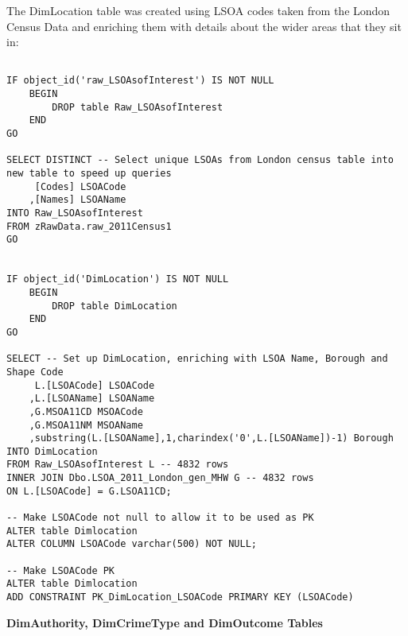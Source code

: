\documentclass{article}
\begin{document}
The DimLocation table was created using LSOA codes taken from the London Census Data and enriching them with details about the wider areas that they sit in:
\begin{lstlisting}

IF object_id('raw_LSOAsofInterest') IS NOT NULL 
	BEGIN 
		DROP table Raw_LSOAsofInterest
	END
GO

SELECT DISTINCT -- Select unique LSOAs from London census table into new table to speed up queries
	 [Codes] LSOACode
	,[Names] LSOAName
INTO Raw_LSOAsofInterest 
FROM zRawData.raw_2011Census1
GO


IF object_id('DimLocation') IS NOT NULL 
	BEGIN 
		DROP table DimLocation
	END
GO

SELECT -- Set up DimLocation, enriching with LSOA Name, Borough and Shape Code
	 L.[LSOACode] LSOACode
	,L.[LSOAName] LSOAName
	,G.MSOA11CD MSOACode
	,G.MSOA11NM MSOAName
	,substring(L.[LSOAName],1,charindex('0',L.[LSOAName])-1) Borough
INTO DimLocation 
FROM Raw_LSOAsofInterest L -- 4832 rows
INNER JOIN Dbo.LSOA_2011_London_gen_MHW G -- 4832 rows
ON L.[LSOACode] = G.LSOA11CD;

-- Make LSOACode not null to allow it to be used as PK
ALTER table Dimlocation
ALTER COLUMN LSOACode varchar(500) NOT NULL;

-- Make LSOACode PK
ALTER table Dimlocation
ADD CONSTRAINT PK_DimLocation_LSOACode PRIMARY KEY (LSOACode)

\end{lstlisting}
\bigskip

\noindent
\textbf{DimAuthority, DimCrimeType and DimOutcome Tables}
\end{document}
